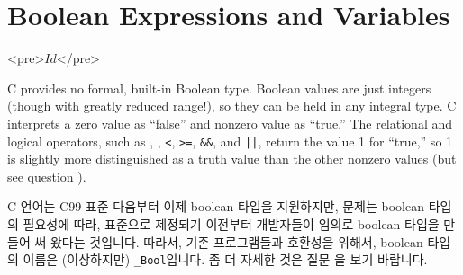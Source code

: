 \chapter{Boolean Expressions and Variables}	\label{chap:boolexpr}

\begin{rawhtml}
<pre>$Id$</pre>
\end{rawhtml}

C provides no formal, built-in Boolean type. Boolean values are just integers
(though with greatly reduced range!), so they can be held in any integral type.
C interprets a zero value as ``false'' and  nonzero value as ``true.''
The relational and logical operators, such as \TT{==}, \TT{!=}, \verb+<+,
\verb+>=+, \verb+&&+, and \verb+||+, return the value 1 for ``true,'' so
1 is slightly more distinguished as a truth value than the other nonzero
values (but see question ).

C 언어는 C99 표준 다음부터 이제 boolean 타입을 지원하지만, 문제는 boolean
타입의 필요성에 따라, 표준으로 제정되기 이전부터 개발자들이 임의로 boolean
타입을 만들어 써 왔다는 것입니다. 따라서, 기존 프로그램들과 호환성을 위해서,
boolean 타입의 이름은 (이상하지만) \verb+_Bool+입니다. 좀 더 자세한 것은
질문 을 보기 바랍니다.


